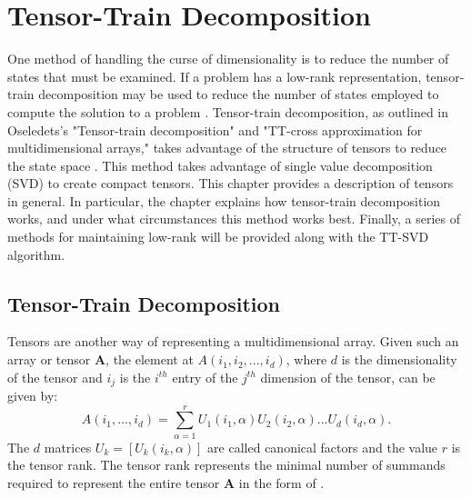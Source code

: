 \chapter{Tensor-Train Decomposition}\label{chp:TT}

One method of handling the curse of dimensionality is to reduce the number of states that must be examined. If a problem has a low-rank representation, tensor-train decomposition may be used to reduce the number of states employed to compute the solution to a problem \cite{Osel3}. Tensor-train decomposition, as outlined in Oseledets's "Tensor-train decomposition" and "TT-cross approximation for multidimensional arrays," takes advantage of the structure of tensors to reduce the state space \cite{Osel1,Osel2}. This method takes advantage of single value decomposition (SVD) to create compact tensors. This chapter provides a description of tensors in general. In particular, the chapter explains how tensor-train decomposition works, and under what circumstances this method works best. Finally, a series of methods for maintaining low-rank will be provided along with the TT-SVD algorithm.

\section{Tensor-Train Decomposition}
Tensors are another way of representing a multidimensional array. Given such an array or tensor \textbf{A}, the element at $A(i_1,i_2,...,i_d)$, where $d$ is the dimensionality of the tensor and $i_j$ is the $i^{th}$ entry of the $j^{th}$ dimension of the tensor, can be given by:
\begin{equation}\label{eqn4}
A(i_1,...,i_d) = \sum_{\alpha=1}^{r}U_1(i_1,\alpha)U_2(i_2,\alpha)...U_d(i_d,\alpha).
\end{equation}
The $d$ matrices $U_k = [U_k(i_k,\alpha)]$ are called canonical factors and the value $r$ is the tensor rank. The tensor rank represents the minimal number of summands required to represent the entire tensor \textbf{A} in the form of .

